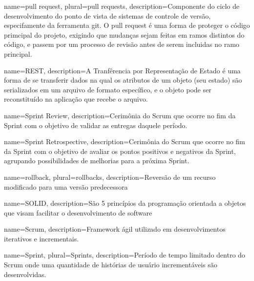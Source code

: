
 {
    name=pull request,
    plural={pull requests},
    description={Componente do ciclo de desenvolvimento do ponto de
      vista de sistemas de controle de versão, especifamente da
      ferramenta git. O pull request é uma forma de proteger o código
      primcipal do projeto, exigindo que mudanças sejam feitas em
      ramos distintos do código, e passem por um processo de revisão
      antes de serem incluidas no ramo principal.}
}


 {
    name=REST,
    description={A Tranfêrencia por Representação de Estado é uma forma
    de se transferir dados na qual os atributos de um objeto (seu
    estado) são serializados em um arquivo de formato específico, e
    o objeto pode ser reconstituído na aplicação que recebe o arquivo.}
}

 {
    name={Sprint Review},
    description={Cerimônia do Scrum que ocorre no fim da Sprint
    com o objetivo de validar as entregas daquele período.}
}

 {
    name={Sprint Retrospective},
    description={Cerimônia do Scrum que ocorre no fim da Sprint com
    o objetivo de avaliar os pontos positivos e negativos
    da Sprint, agrupando possibilidades de melhorias
    para a próxima Sprint.}
}

 {
    name={rollback},
    plural={rollbacks},
    description={Reversão de um recurso modificado para uma versão predecessora}
}

 {
    name=SOLID,
    description={São 5 princípios da programação orientada a objetos que visam facilitar o desenvolvimento de software}
}

 {
    name=Scrum,
    description={Framework ágil utilizado em desenvolvimentos iterativos
    e incrementais.}
}

 {
    name=Sprint,
plural={Sprints},
    description={Período de tempo limitado dentro do Scrum onde uma quantidade de histórias de usuário incrementáveis são desenvolvidas.}
}

